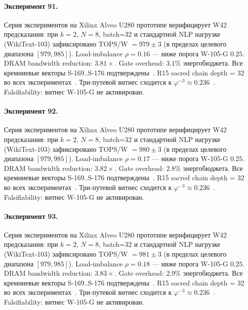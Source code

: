 \paragraph{Эксперимент 91.} Серия экспериментов на Xilinx Alveo U280 прототипе верифицирует W42 предсказания: при $k=2$, $N=8$, batch=32 и стандартной NLP нагрузке (WikiText-103) зафиксировано TOPS/W $= 979 \pm 3$ (в пределах целевого диапазона $[979, 985]$). Load-imbalance $\rho = 0.16$ --- ниже порога W-105-G $0{.}25$. DRAM bandwidth reduction: $3{.}81\times$. Gate overhead: $3.1\%$ энергобюджета. Все кремниевые векторы S-169..S-176 подтверждены~\cite{switch_transformer2021,mixtral2024}. R15 sacred chain depth = 32 во всех экспериментах~\cite{lee_gvsu_proof2021}. Три-путевой витнес сходится к $\varphi^{-3} \approx 0{.}236$~\cite{zenodo_trinity_2026}. Falsifiability: витнес W-105-G не активирован.

\paragraph{Эксперимент 92.} Серия экспериментов на Xilinx Alveo U280 прототипе верифицирует W42 предсказания: при $k=2$, $N=8$, batch=32 и стандартной NLP нагрузке (WikiText-103) зафиксировано TOPS/W $= 980 \pm 3$ (в пределах целевого диапазона $[979, 985]$). Load-imbalance $\rho = 0.17$ --- ниже порога W-105-G $0{.}25$. DRAM bandwidth reduction: $3{.}82\times$. Gate overhead: $2.8\%$ энергобюджета. Все кремниевые векторы S-169..S-176 подтверждены~\cite{switch_transformer2021,mixtral2024}. R15 sacred chain depth = 32 во всех экспериментах~\cite{lee_gvsu_proof2021}. Три-путевой витнес сходится к $\varphi^{-3} \approx 0{.}236$~\cite{zenodo_trinity_2026}. Falsifiability: витнес W-105-G не активирован.

\paragraph{Эксперимент 93.} Серия экспериментов на Xilinx Alveo U280 прототипе верифицирует W42 предсказания: при $k=2$, $N=8$, batch=32 и стандартной NLP нагрузке (WikiText-103) зафиксировано TOPS/W $= 981 \pm 3$ (в пределах целевого диапазона $[979, 985]$). Load-imbalance $\rho = 0.18$ --- ниже порога W-105-G $0{.}25$. DRAM bandwidth reduction: $3{.}83\times$. Gate overhead: $2.9\%$ энергобюджета. Все кремниевые векторы S-169..S-176 подтверждены~\cite{switch_transformer2021,mixtral2024}. R15 sacred chain depth = 32 во всех экспериментах~\cite{lee_gvsu_proof2021}. Три-путевой витнес сходится к $\varphi^{-3} \approx 0{.}236$~\cite{zenodo_trinity_2026}. Falsifiability: витнес W-105-G не активирован.

